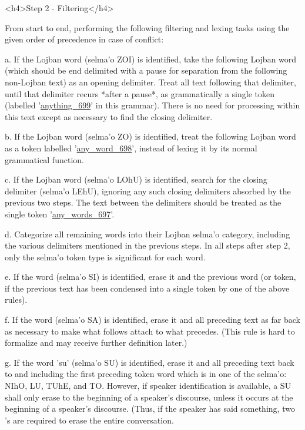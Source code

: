 <h4>Step 2 - Filtering</h4>

From start to end, performing the following filtering and
    lexing tasks using the given order of precedence in case of
    conflict:

a. If the Lojban word  (selma'o ZOI) is identified,
    take the following Lojban word (which should be end delimited
    with a pause for separation from the following non-Lojban text)
    as an opening delimiter. Treat all text following that
    delimiter, until that delimiter recurs *after a pause*, as
    grammatically a single token (labelled '\hyperref[html:y699]{anything\_699}' in this grammar). There is no
    need for processing within this text except as necessary to
    find the closing delimiter.

b. If the Lojban word  (selma'o ZO) is identified,
    treat the following Lojban word as a token labelled '\hyperref[html:y698]{any\_word\_698}', instead of lexing it by its
    normal grammatical function.

c. If the Lojban word  (selma'o LOhU) is identified,
    search for the closing delimiter  (selma'o LEhU),
    ignoring any such closing delimiters absorbed by the previous
    two steps. The text between the delimiters should be treated as
    the single token '\hyperref[html:y697]{any\_words\_697}'.

d. Categorize all remaining words into their Lojban selma'o
    category, including the various delimiters mentioned in the
    previous steps. In all steps after step 2, only the selma'o
    token type is significant for each word.

e. If the word  (selma'o SI) is identified, erase it
    and the previous word (or token, if the previous text has been
    condensed into a single token by one of the above rules).

f. If the word  (selma'o SA) is identified, erase it
    and all preceding text as far back as necessary to make what
    follows attach to what precedes. (This rule is hard to
    formalize and may receive further definition later.)

g. If the word 'su' (selma'o SU) is identified, erase it and
    all preceding text back to and including the first preceding
    token word which is in one of the selma'o: NIhO, LU, TUhE, and
    TO. However, if speaker identification is available, a SU shall
    only erase to the beginning of a speaker's discourse, unless it
    occurs at the beginning of a speaker's discourse. (Thus, if the
    speaker has said something, two 's are required to erase
    the entire conversation.


